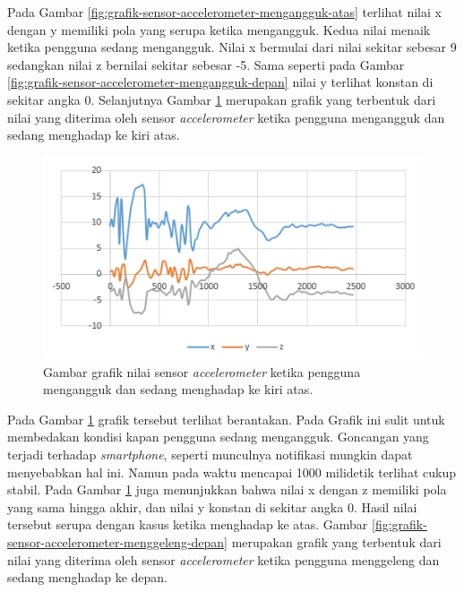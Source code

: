 Pada Gambar \ref{fig:grafik-sensor-accelerometer-mengangguk-atas} terlihat nilai x dengan y memiliki pola yang serupa ketika mengangguk. Kedua nilai menaik ketika pengguna sedang mengangguk. Nilai x bermulai dari nilai sekitar sebesar 9 sedangkan nilai z bernilai sekitar sebesar -5. Sama seperti pada Gambar \ref{fig:grafik-sensor-accelerometer-mengangguk-depan} nilai y terlihat konstan di sekitar angka 0. Selanjutnya Gambar \ref{fig:grafik-sensor-accelerometer-mengangguk-kiri-atas} merupakan grafik yang terbentuk dari nilai yang diterima oleh sensor \textit{accelerometer} ketika pengguna mengangguk dan sedang menghadap ke kiri atas.


\begin{figure}[htbp]
\centering
\includegraphics[scale=1]{Gambar/grafik-sensor-accelerometer-mengangguk-kiri-atas.png}
\caption{Gambar grafik nilai sensor \textit{accelerometer} ketika pengguna mengangguk dan sedang menghadap ke kiri atas.} 
\label{fig:grafik-sensor-accelerometer-mengangguk-kiri-atas}
\end{figure}

Pada Gambar \ref{fig:grafik-sensor-accelerometer-mengangguk-kiri-atas} grafik tersebut terlihat berantakan. Pada Grafik ini sulit untuk membedakan kondisi kapan pengguna sedang mengangguk. Goncangan yang terjadi terhadap \textit{smartphone}, seperti munculnya notifikasi mungkin dapat menyebabkan hal ini. Namun pada waktu mencapai 1000 milidetik terlihat cukup stabil. Pada Gambar \ref{fig:grafik-sensor-accelerometer-mengangguk-kiri-atas} juga menunjukkan bahwa nilai x dengan z memiliki pola yang sama hingga akhir, dan nilai y konstan di sekitar angka 0. Hasil nilai tersebut serupa dengan kasus ketika menghadap ke atas. Gambar \ref{fig:grafik-sensor-accelerometer-menggeleng-depan} merupakan grafik yang terbentuk dari nilai yang diterima oleh sensor \textit{accelerometer} ketika pengguna menggeleng dan sedang menghadap ke depan.

